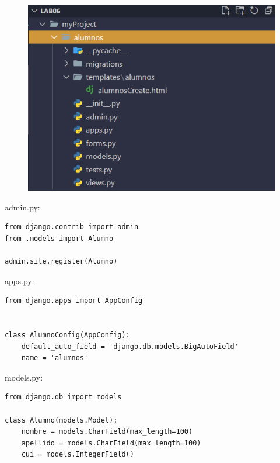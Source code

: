 \documentclass{article}
\begin{document}
    \begin{figure}[H]
           \centering
           \includegraphics[scale=0.6]{latex/img/img3.png}
     \end{figure}


\item admin.py:
 
\begin{lstlisting}
from django.contrib import admin
from .models import Alumno

admin.site.register(Alumno)

\end{lstlisting}

\item apps.py:
 
\begin{lstlisting}
from django.apps import AppConfig


class AlumnoConfig(AppConfig):
    default_auto_field = 'django.db.models.BigAutoField'
    name = 'alumnos'

\end{lstlisting}

\item models.py:
 
\begin{lstlisting}
from django.db import models

class Alumno(models.Model):
    nombre = models.CharField(max_length=100)
    apellido = models.CharField(max_length=100)
    cui = models.IntegerField()
   

\end{lstlisting}
     
\end{document}
